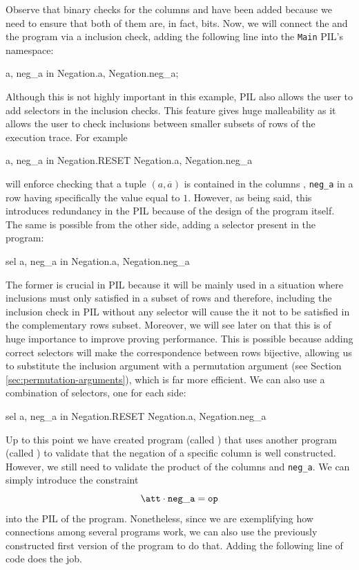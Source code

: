 Observe that binary checks for the columns \bits and \nbits have been added because we need to ensure that both of them are, in fact, bits. Now, we will connect the \Main and the \Negation program via a inclusion check, adding the following line into the \texttt{Main} PIL's namespace:

\begin{pil}
{a, neg_a} in {Negation.a, Negation.neg_a};
\end{pil}

Although this is not highly important in this example, PIL also allows the user to add selectors in the inclusion checks. This feature gives huge malleability as it allows the user to check inclusions between smaller subsets of rows of the execution trace. For example

\begin{pil}
{a, neg_a} in Negation.RESET {Negation.a, Negation.neg_a}
\end{pil}

will enforce checking that a tuple $(a, \overline{a})$ is contained in the columns \att, \texttt{neg\_a} in a row having specifically the \RESET value equal to $1$. However, as being said, this introduces redundancy in the PIL because of the design of the program itself. The same is possible from the other side, adding a selector \SEL present in the \Main program:

\begin{pil}
sel {a, neg_a} in {Negation.a, Negation.neg_a}
\end{pil}

The former is crucial in PIL because it will be mainly used in a situation where inclusions must only satisfied in a subset of rows and therefore, including the inclusion check in PIL without any selector will cause the it not to be satisfied in the complementary rows subset. Moreover, we will see later on that this is of huge importance to improve proving performance. This is possible because adding correct selectors will make the correspondence between rows bijective, allowing us to substitute the inclusion argument with a permutation argument (see Section \ref{sec:permutation-arguments}), which is far more efficient.  We can also use a combination of selectors, one for each side:

\begin{pil}
sel {a, neg_a} in Negation.RESET {Negation.a, Negation.neg_a}
\end{pil}


Up to this point we have created program (called \Main) that uses another program (called \Negation) to validate that the negation of a specific column \att is well constructed. However, we still need to validate the product of the columns \att and \texttt{neg\_a}. We can simply introduce the constraint 
\[
\att \cdot \mathtt{neg\_a} = \mathtt{op}
\]
into the PIL of the \Main program. Nonetheless, since we are exemplifying how connections among several programs work, we can also use the previously constructed first version of the \Multiplier program to do that. Adding the following line of code does the job.


